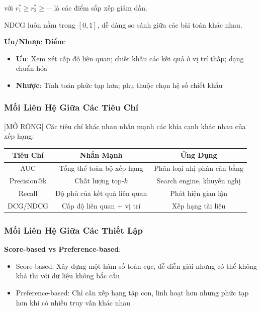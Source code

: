 với $r^*_1 \geq r^*_2 \geq \cdots$ là các điểm sắp xếp giảm dần.

NDCG luôn nằm trong $[0,1]$, dễ dàng so sánh giữa các bài toán khác nhau.

\textbf{Ưu/Nhược Điểm}:
\begin{itemize}
    \item \textbf{Ưu}: Xem xét cấp độ liên quan; chiết khấu các kết quả ở vị trí thấp; dạng chuẩn hóa
    \item \textbf{Nhược}: Tính toán phức tạp hơn; phụ thuộc chọn hệ số chiết khấu
\end{itemize}

\subsubsection{Mối Liên Hệ Giữa Các Tiêu Chí}

[MỞ RỘNG] Các tiêu chí khác nhau nhấn mạnh các khía cạnh khác nhau của xếp hạng:

\begin{table}[h]
\centering
\begin{tabular}{|c|c|c|}
\hline
\textbf{Tiêu Chí} & \textbf{Nhấn Mạnh} & \textbf{Ứng Dụng} \\
\hline
AUC & Tổng thể toàn bộ xếp hạng & Phân loại nhị phân cân bằng \\
\hline
Precision@k & Chất lượng top-$k$ & Search engine, khuyến nghị \\
\hline
Recall & Độ phủ của kết quả liên quan & Phát hiện gian lận \\
\hline
DCG/NDCG & Cấp độ liên quan + vị trí & Xếp hạng tài liệu \\
\hline
\end{tabular}
\end{table}

\subsubsection{Mối Liên Hệ Giữa Các Thiết Lập}

\textbf{Score-based vs Preference-based}:
\begin{itemize}
    \item Score-based: Xây dựng một hàm số toàn cục, dễ diễn giải nhưng có thể không khả thi với dữ liệu không bắc cầu
    \item Preference-based: Chỉ cần xếp hạng tập con, linh hoạt hơn nhưng phức tạp hơn khi có nhiều truy vấn khác nhau
\end{itemize}

